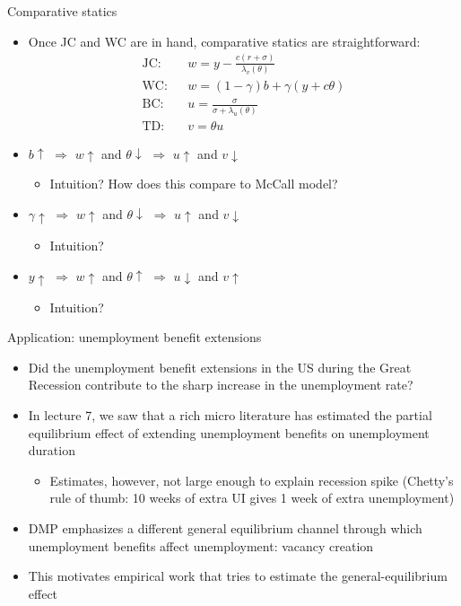 \documentclass[9pt]{beamer}
\newcommand{\bit}{\begin{itemize}}
\newcommand{\eit}{\end{itemize}}
\newcommand{\bc}{\color{blue}}
\begin{document}
\begin{frame}{Comparative statics}

\bit
\setlength\itemsep{1em}

\item Once JC and WC are in hand, comparative statics are straightforward:
\begin{eqnarray}
\text{JC:} && w = y - \frac{c(r+\sigma)}{\lambda_v(\theta)} \nonumber \\
\text{WC:} && w = (1-\gamma)b + \gamma (y +c \theta) \nonumber \\
\text{BC:} && u = \frac{\sigma}{\sigma + \lambda_u(\theta)} \nonumber \\
\text{TD:} && v = \theta u \nonumber
\end{eqnarray}

\item $b \uparrow$ $\Rightarrow$ $w \uparrow$ and $\theta \downarrow$ $\Rightarrow$ $u \uparrow$ and $v \downarrow$
\bit
	\item Intuition? How does this compare to McCall model?
\eit

\item $\gamma \uparrow$ $\Rightarrow$ $w \uparrow$ and $\theta \downarrow$ $\Rightarrow$ $u \uparrow$ and $v \downarrow$
\bit
	\item Intuition?
\eit

\item $y \uparrow$ $\Rightarrow$ $w \uparrow$ and $\theta \uparrow$ $\Rightarrow$ $u \downarrow$ and $v \uparrow$
\bit
	\item Intuition?
\eit
\eit
\end{frame}

\begin{frame}{Application: unemployment benefit extensions}

\bit
\setlength\itemsep{1em}

\item Did the unemployment benefit extensions in the US during the Great Recession contribute to the sharp increase in the unemployment rate?

\item In lecture 7, we saw that a rich micro literature has estimated the partial equilibrium effect of extending unemployment benefits on unemployment duration
\bit
	\item Estimates, however, not large enough to explain recession spike (Chetty's rule of thumb: 10 weeks of extra UI gives 1 week of extra unemployment)
\eit

\item DMP emphasizes a different {\bc general equilibrium channel} through which unemployment benefits affect unemployment: {\bc vacancy creation}
\item This motivates empirical work that tries to estimate the general-equilibrium effect
\eit
\end{frame}
\end{document}
